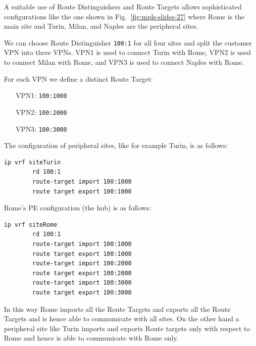 \documentclass{article}
\newenvironment{codice}
{
\noindent
\begin{minipage}[b]{\columnwidth}
\definecolor{shadecolor}{rgb}{1,1,1}
\begin{framed}}
{
\vspace{-0.4cm}
\end{framed}
\end{minipage}
\definecolor{shadecolor}{rgb}{1,1,0.7}
}
\begin{document}
\begin{shaded}
\noindent
A suitable use of Route Distinguishers and Route Targets allows sophisticated
configurations like the one shown in Fig.~\ref{fig:mpls-slides-27} where Rome is
the main site and Turin, Milan, and Naples are the peripheral sites.



We can choose  Route Distinguisher \texttt{100:1} for all four sites and split the customer VPN into three VPNs. VPN1 is used to connect Turin with Rome,
VPN2 is used to connect Milan with Rome, and VPN3 is used to connect Naples with Rome.

For each VPN we define a distinct Route Target:
\begin{enumerate}
\item[VPN1:] \texttt{100:1000}
\item[VPN2:] \texttt{100:2000}
\item[VPN3:] \texttt{100:3000}
\end{enumerate}

The configuration of peripheral sites, like for example Turin, is as
follows:\\
\begin{codice}
\begin{verbatim}
ip vrf siteTurin
        rd 100:1
        route-target import 100:1000
        route target export 100:1000
\end{verbatim}
\end{codice}

Rome's PE configuration (the hub) is as follows:\\
\begin{codice}
\begin{verbatim}
ip vrf siteRome
        rd 100:1
        route-target import 100:1000
        route target export 100:1000
        route-target import 100:2000
        route target export 100:2000
        route-target import 100:3000
        route target export 100:3000
\end{verbatim}
\end{codice}

In this way Rome imports all the Route Targets and exports all the Route Targets and is
hence able to communicate with all sites. On the other hand a peripheral site like Turin
imports and exports Route targets only with respect to Rome and hence is able to communicate 
with Rome only.
\end{shaded}
\end{document}
